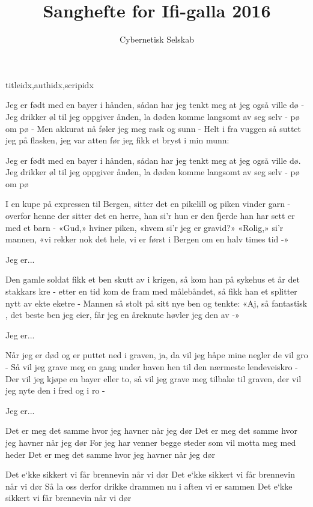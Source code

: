 \documentclass[14pt,letterpaper,norsk]{article}
\title{Sanghefte for Ifi-galla 2016}
\author{Cybernetisk Selskab}
\date{}
\begin{document}

\newpage

\begin{songs}{titleidx,authidx,scripidx}

\beginverse
Jeg er født med en bayer i hånden,
sådan har jeg tenkt meg at jeg også ville dø -
Jeg drikker øl til jeg oppgiver ånden,
la døden komme langsomt av seg selv - pø om pø -
Men akkurat nå føler jeg meg rask og sunn -
Helt i fra vuggen så suttet jeg på flasken,
jeg var atten før jeg fikk et bryst i min munn:
\endverse

\beginchorus
Jeg er født med en bayer i hånden,
sådan har jeg tenkt meg at jeg også ville dø.
Jeg drikker øl til jeg oppgiver ånden,
la døden komme langsomt av seg selv - pø om pø
\endchorus

\beginverse
I en kupe på expressen til Bergen,
sitter det en pikelill og piken vinder garn -
overfor henne der sitter det en herre,
han si'r hun er den fjerde han har sett er med et barn -
«Gud,» hviner piken, «hvem si'r jeg er gravid?»
«Rolig,» si'r mannen, «vi rekker nok det hele,
vi er først i Bergen om en halv times tid -»
\endverse

\beginchorus
Jeg er...
\endchorus

\beginverse
Den gamle soldat fikk et ben skutt av i krigen,
så kom han på sykehus et år det stakkars kre -
etter en tid kom de fram med målebåndet,
så fikk han et splitter nytt av ekte eketre -
Mannen så stolt på sitt nye ben og tenkte:
«Aj, så fantastisk , det beste ben jeg eier,
får jeg en åreknute høvler jeg den av -»
\endverse

\beginchorus
Jeg er...
\endchorus

\beginverse
Når jeg er død og er puttet ned i graven,
ja, da vil jeg håpe mine negler de vil gro -
Så vil jeg grave meg en gang under haven
hen til den nærmeste lendeveiskro -
Der vil jeg kjøpe en bayer eller to,
så vil jeg grave meg tilbake til graven,
der vil jeg nyte den i fred og i ro -
\endverse

\beginchorus
Jeg er...
\endchorus
\endsong

\beginverse
Det er meg det samme hvor jeg havner når jeg dør
Det er meg det samme hvor jeg havner når jeg dør
For jeg har venner begge steder som vil motta meg med heder
Det er meg det samme hvor jeg havner når jeg dør
\endverse

\beginverse
Det e`kke sikkert vi får brennevin når vi dør
Det e`kke sikkert vi får brennevin når vi dør
Så la oss derfor drikke drammen nu i aften vi er sammen
Det e`kke sikkert vi får brennevin når vi dør
\endverse


\end{songs}
\end{document}
